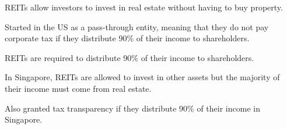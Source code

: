 REITs allow investors to invest in real estate without having to buy property.

Started in the US as a pass-through entity, meaning that they do not pay corporate tax if they distribute 90\% of their income to shareholders.

REITs are required to distribute 90\% of their income to shareholders.

In Singapore, REITs are allowed to invest in other assets but the majority of their income must come from real estate.

Also granted tax transparency if they distribute 90\% of their income in Singapore.


